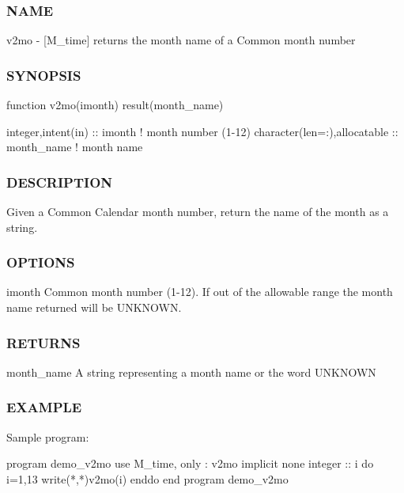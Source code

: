 \begin{DoxyVerb}
\subsubsection*{N\+A\+ME}

v2mo -\/ \mbox{[}M\+\_\+time\mbox{]} returns the month name of a Common month number 

\subsubsection*{S\+Y\+N\+O\+P\+S\+IS}

\begin{DoxyVerb}function v2mo(imonth) result(month_name)

 integer,intent(in)           :: imonth      ! month number (1-12)
 character(len=:),allocatable :: month_name  ! month name
\end{DoxyVerb}


\subsubsection*{D\+E\+S\+C\+R\+I\+P\+T\+I\+ON}

Given a Common Calendar month number, return the name of the month as a string.

\subsubsection*{O\+P\+T\+I\+O\+NS}

imonth Common month number (1-\/12). If out of the allowable range the month name returned will be \textquotesingle{}U\+N\+K\+N\+O\+WN\textquotesingle{}. \subsubsection*{R\+E\+T\+U\+R\+NS}

month\+\_\+name A string representing a month name or the word \textquotesingle{}U\+N\+K\+N\+O\+WN\textquotesingle{}

\subsubsection*{E\+X\+A\+M\+P\+LE}

\begin{DoxyVerb}Sample program:

 program demo_v2mo
 use M_time, only : v2mo
 implicit none
 integer :: i
    do i=1,13
       write(*,*)v2mo(i)
    enddo
 end program demo_v2mo


\end{DoxyVerb}
\end{DoxyVerb}
